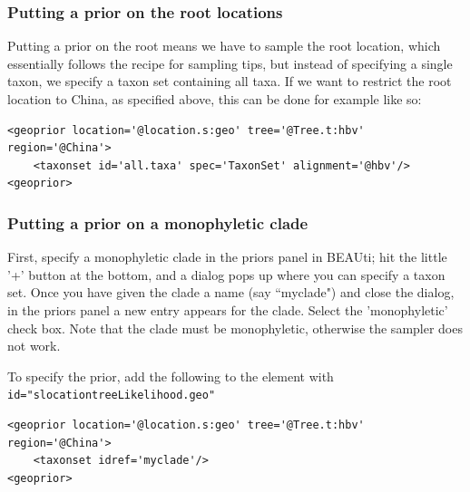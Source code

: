 \documentclass{article}
\begin{document}
\subsubsection*{Putting a prior on the root locations}

Putting a prior on the root means we have to sample the root location, which essentially follows the recipe for sampling tips, but instead of specifying a single taxon, we specify a taxon set containing all taxa. If we want to restrict the root location to China, as specified above, this can be done for example like so:

\begin{verbatim}
<geoprior location='@location.s:geo' tree='@Tree.t:hbv' region='@China'>
	<taxonset id='all.taxa' spec='TaxonSet' alignment='@hbv'/>
<geoprior>
\end{verbatim}


\subsubsection*{Putting a prior on a monophyletic clade}

First, specify a monophyletic clade in the priors panel in BEAUti; hit the little '+' button at the bottom, and a dialog pops up where you can specify a taxon set. Once you have given the clade a name (say ``myclade") and close the dialog, in the priors panel a new entry appears for the clade. Select the 'monophyletic' check box. Note that the clade must be monophyletic, otherwise the sampler does not work.

To specify the prior, add the following to the element with {\tt id="slocationtreeLikelihood.geo"}

\begin{verbatim}
<geoprior location='@location.s:geo' tree='@Tree.t:hbv' region='@China'>
	<taxonset idref='myclade'/>
<geoprior>
\end{verbatim}







\end{document}
